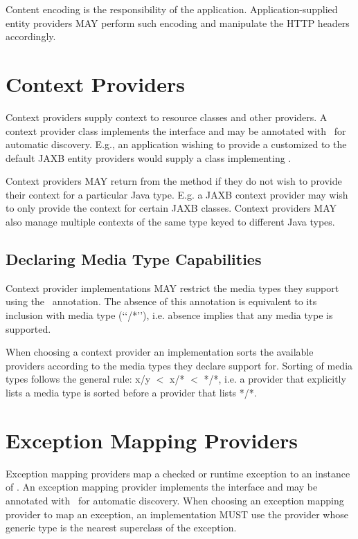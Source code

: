 Content encoding is the responsibility of the application. Application-supplied entity providers MAY perform such encoding and manipulate the HTTP headers accordingly.

\section{Context Providers}
\label{contextprovider}

Context providers supply context to resource classes and other providers. A context provider class implements the  interface and may be annotated with \Provider\ for automatic discovery. E.g., an application wishing to provide a customized  to the default JAXB entity providers would supply a class implementing .

Context providers MAY return  from the  method if they do not wish to provide their context for a particular Java type. E.g. a JAXB context provider may wish to only provide the context for certain JAXB classes. Context providers MAY also manage multiple contexts of the same type keyed to different Java types.

\subsection{Declaring Media Type Capabilities}
\label{context_media_type}

Context provider implementations MAY restrict the media types they support using the \Produces\ annotation. The absence of this annotation is equivalent to its inclusion with media type (\lq\lq*/*\rq\rq), i.e. absence implies that any media type is supported.

When choosing a context provider an implementation sorts the available providers according to the media types they declare support for. Sorting of media types follows the general rule: x/y $<$ x/* $<$ */*, i.e. a provider that explicitly lists a media type is sorted before a provider that lists */*.

\section{Exception Mapping Providers}
\label{exceptionmapper}

Exception mapping providers map a checked or runtime exception to an instance of \Response. An exception mapping provider implements the  interface and may be annotated with \Provider\ for automatic discovery. When choosing an exception mapping provider to map an exception, an implementation MUST use the provider whose generic type is the nearest superclass of the exception.

